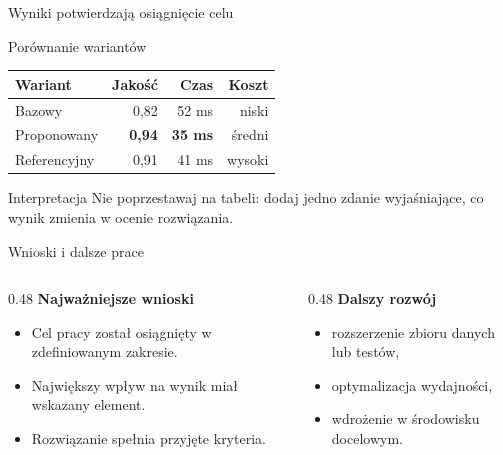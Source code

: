 \begin{frame}{Wyniki potwierdzają osiągnięcie celu}
  \begin{center}
    \hfill
    \hfill
  \end{center}
  \vspace{7mm}
\end{frame}

\begin{frame}{Porównanie wariantów}
  \centering
  \small
  \begin{tabularx}{\textwidth}{Xrrr}
    \toprule
    \textbf{Wariant} & \textbf{Jakość} & \textbf{Czas} & \textbf{Koszt} \\
    \midrule
    Bazowy & 0,82 & 52 ms & niski \\
    Proponowany & \textbf{0,94} & \textbf{35 ms} & średni \\
    Referencyjny & 0,91 & 41 ms & wysoki \\
    \bottomrule
  \end{tabularx}
  \vspace{6mm}
  \begin{block}{Interpretacja}
    Nie poprzestawaj na tabeli: dodaj jedno zdanie wyjaśniające, co wynik zmienia w ocenie rozwiązania.
  \end{block}
\end{frame}

\begin{frame}{Wnioski i dalsze prace}
  \begin{columns}[T,onlytextwidth]
    \begin{column}{0.48\textwidth}
      \textbf{Najważniejsze wnioski}
      \begin{itemize}
        \item Cel pracy został osiągnięty w zdefiniowanym zakresie.
        \item Największy wpływ na wynik miał wskazany element.
        \item Rozwiązanie spełnia przyjęte kryteria.
      \end{itemize}
    \end{column}
    \begin{column}{0.48\textwidth}
      \textbf{Dalszy rozwój}
      \begin{itemize}
        \item rozszerzenie zbioru danych lub testów,
        \item optymalizacja wydajności,
        \item wdrożenie w środowisku docelowym.
      \end{itemize}
    \end{column}
  \end{columns}
\end{frame}
